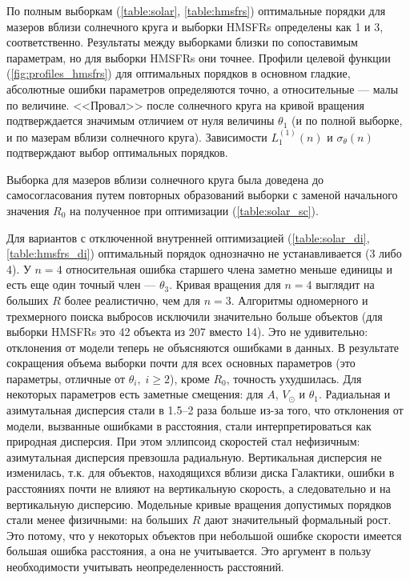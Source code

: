 \documentclass[a4paper, oneside, 14pt]{article}
\begin{document}
По полным выборкам (\autoref{table:solar}, \autoref{table:hmsfrs}) оптимальные порядки для мазеров вблизи солнечного круга и выборки HMSFRs определены как 1 и 3, соответственно. Результаты между выборками близки по сопоставимым параметрам, но для выборки HMSFRs они точнее. Профили целевой функции (\autoref{fig:profiles_hmsfrs}) для оптимальных порядков в основном гладкие, абсолютные ошибки параметров определяются точно, а относительные --- малы по величине. <<Провал>> после солнечного круга на кривой вращения подтверждается значимым отличием от нуля величины $ \theta_1 $ (и по полной выборке, и по мазерам вблизи солнечного круга). Зависимости $ L_1^{(1)}(n) $ и $ \sigma_\theta(n) $ подтверждают выбор оптимальных порядков.

Выборка для мазеров вблизи солнечного круга была доведена до самосогласования путем повторных образований выборки с заменой начального значения $ R_0 $ на полученное при оптимизации (\autoref{table:solar_sc}).

Для вариантов с отключенной внутренней оптимизацией (\autoref{table:solar_di}, \autoref{table:hmsfrs_di}) оптимальный порядок однозначно не устанавливается (3 либо 4). У $ n = 4 $ относительная ошибка старшего члена заметно меньше единицы и есть еще один точный член --- $ \theta_3 $. Кривая вращения для $ n = 4 $ выглядит на больших $ R $ более реалистично, чем для $ n = 3 $. Алгоритмы одномерного и трехмерного поиска выбросов исключили значительно больше объектов (для выборки HMSFRs это 42 объекта из 207 вместо 14). Это не удивительно: отклонения от модели теперь не объясняются ошибками в данных. В результате сокращения объема выборки почти для всех основных параметров (это параметры, отличные от $ \theta_i, \; i \ge 2 $), кроме $ R_0 $, точность ухудшилась. Для некоторых параметров есть заметные смещения: для $ A $, $ V_\odot $ и $ \theta_1 $. Радиальная и азимутальная дисперсия стали в 1.5--2 раза больше из-за того, что отклонения от модели, вызванные ошибками в расстояния, стали интерпретироваться как природная дисперсия. При этом эллипсоид скоростей стал нефизичным: азимутальная дисперсия превзошла радиальную. Вертикальная дисперсия не изменилась, т.к. для объектов, находящихся вблизи диска Галактики, ошибки в расстояниях почти не влияют на вертикальную скорость, а следовательно и на вертикальную дисперсию. Модельные кривые вращения допустимых порядков стали менее физичными: на больших $ R $ дают значительный формальный рост. Это потому, что у некоторых объектов при небольшой ошибке скорости имеется большая ошибка расстояния, а она не учитывается. Это аргумент в пользу необходимости учитывать неопределенность расстояний.
\end{document}

